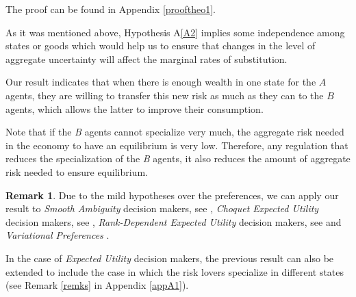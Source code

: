 \documentclass[pdftex]{article}
\numberwithin{equation}{section}
\theoremstyle{th}
\newtheorem{proof lemma}{{Proof Lemma}.}
\theoremstyle{definition}
\newtheorem{remark}{Remark}%
\begin{document}
{The proof can be found in Appendix \ref{prooftheo1}.

As it was mentioned above, Hypothesis A\ref{A2} implies some independence among states or goods which would help us to ensure that changes in the level of aggregate uncertainty will affect the marginal rates of substitution. %


Our result indicates that when there is enough wealth in one state for the $A$ agents, they are willing to transfer this new risk as much as they can to the $B$ agents, which allows the latter to improve their consumption.%


Note that if the \emph{B} agents cannot specialize very much, the aggregate risk needed in the economy to have an equilibrium is very low. Therefore, any regulation that reduces the specialization of the \emph{B} agents, it also reduces the amount of aggregate risk needed to ensure equilibrium.


\begin{remark}

Due to the mild hypotheses over the preferences, we can apply our result to \emph{Smooth Ambiguity} decision makers, see \cite{KMM}, \emph{Choquet Expected Utility} decision makers, see \cite{Schmeidler}, \emph{Rank-Dependent Expected Utility} decision makers, see \cite{Quiggin1,Quiggin2} \cite{Yaari} and \emph{Variational Preferences} \cite{MMR}.

\end{remark}

In the case of \emph{Expected Utility} decision makers, the previous result can also be extended to include the case in which the risk lovers specialize in different states (see Remark \ref{remks} in Appendix \ref{appA1}).

%



}
\end{document}
